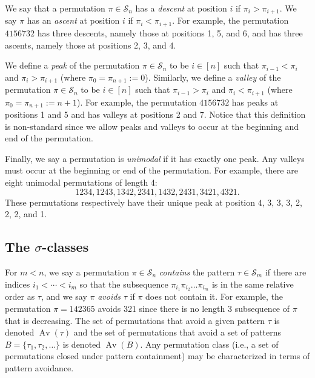\documentclass[12pt]{article}
\DeclareMathOperator{\av}{Av}
\renewcommand{\S}{\mathcal{S}}
\theoremstyle{plain}
\theoremstyle{definition}
\begin{document}
We say that a permutation $\pi\in \S_n$ has a \textit{descent} at position $i$ if $\pi_i>\pi_{i+1}$. We say $\pi$ has an \textit{ascent} at position $i$ if $\pi_{i}<\pi_{i+1}$. For example, the permutation $4156732$ has three descents, namely those at positions 1, 5, and 6, and has three ascents, namely those at positions 2, 3, and 4. 

We define a \textit{peak} of the permutation $\pi\in\S_n$ to be $i\in[n]$ such that $\pi_{i-1}<\pi_i$ and $\pi_i>\pi_{i+1}$ (where $\pi_0=\pi_{n+1}:=0$). Similarly, we define a \textit{valley} of the permutation $\pi\in\S_n$ to be $i\in[n]$ such that $\pi_{i-1}>\pi_i$ and $\pi_i<\pi_{i+1}$ (where $\pi_0=\pi_{n+1}:=n+1$). For example, the permutation $4156732$ has peaks at positions 1 and 5 and has valleys at positions 2 and 7. Notice that this definition is non-standard since we allow peaks and valleys to occur at the beginning and end of the permutation.

Finally, we say a permutation is \textit{unimodal} if it has exactly one peak. Any valleys must occur at the beginning or end of the permutation. For example, there are eight unimodal permutations of length 4: $$1234, 1243, 1342, 2341, 1432, 2431, 3421, 4321.$$ These permutations respectively have their unique peak at position $4$, 3, 3, 3, 2, 2, 2, and 1.


\subsection{The $\sigma$-classes}

For $m<n$, we say a permutation $\pi\in \S_n$ \textit{contains} the pattern $\tau \in \S_m$ if there are indices $i_1<\cdots <i_m$ so that the subsequence $\pi_{i_1}\pi_{i_2} \ldots \pi_{i_m}$ is in the same relative order as $\tau$, and we say $\pi$ \textit{avoids} $\tau$ if $\pi$ does not contain it. For example, the permutation $\pi=142365$ avoids 321 since there is no length 3 subsequence of $\pi$ that is decreasing. The set of permutations that avoid a given pattern $\tau$ is denoted $\av(\tau)$ and the set of permutations that avoid a set of patterns $B = \{\tau_1, \tau_2, \ldots\}$ is denoted $\av(B)$. Any permutation class (i.e., a set of permutations closed under pattern containment) may be characterized in terms of pattern avoidance. %
\end{document}

